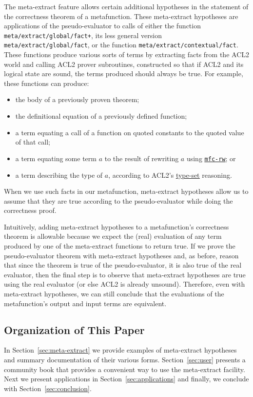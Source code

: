 The meta-extract feature allows certain additional hypotheses in the
statement of the correctness theorem of a metafunction.  These meta-extract
hypotheses are applications of the pseudo-evaluator to calls of either the
function \texttt{meta\-/extract\-/global\-/fact+}, its less general
version \texttt{meta\-/extract\-/global\-/fact}, or the function
\texttt{meta\-/extract\-/contextual\-/fact}.
These functions produce various
sorts of terms by extracting facts from the ACL2 world and calling
ACL2 prover subroutines, constructed so that if ACL2 and its logical
state are sound, the terms produced should always be true.  For
example, these functions can produce:
\begin{itemize}
\item the body of a previously proven theorem;
\item the definitional equation of a previously defined function;
\item a term equating a call of a function on quoted constants to the
  quoted value of that call;
\item a term equating some term $a$ to the result of rewriting $a$
  using \href{http://www.cs.utexas.edu/users/moore/acl2/manuals/current/manual/index.html?topic=ACL2\_\_\_\_MFC-RW}{\underline{\tt mfc-rw}}; or
\item a term describing the type of $a$, according to ACL2's
  \href{http://www.cs.utexas.edu/users/moore/acl2/manuals/current/manual/index.html?topic=ACL2\_\_\_\_TYPE-SET}{\underline{type-set}}
  reasoning.
\end{itemize}
When we use such facts in our metafunction, meta-extract hypotheses
allow us to assume that they are true according to the
pseudo-evaluator while doing the correctness proof.

Intuitively, adding meta-extract hypotheses to a metafunction's
correctness theorem is allowable because we expect the (real)
evaluation of any term produced by one of the meta-extract functions
to return true.  If we prove the pseudo-evaluator theorem with
meta-extract hypotheses and, as before, reason that since the theorem
is true of the pseudo-evaluator, it is also true of the real
evaluator, then the final step is to observe that meta-extract
hypotheses are true using the real evaluator (or else ACL2 is already
unsound).  Therefore, even with meta-extract hypotheses, we can still
conclude that the evaluations of the metafunction's output and input
terms are equivalent.

\subsection{Organization of This Paper}

In Section~\ref{sec:meta-extract} we provide examples of meta-extract
hypotheses and summary documentation of their various forms.
Section~\ref{sec:user} presents a community book that
provides a convenient way to use the meta-extract facility.  Next we
present applications in Section~\ref{sec:applications} and finally, we
conclude with Section~\ref{sec:conclusion}.
